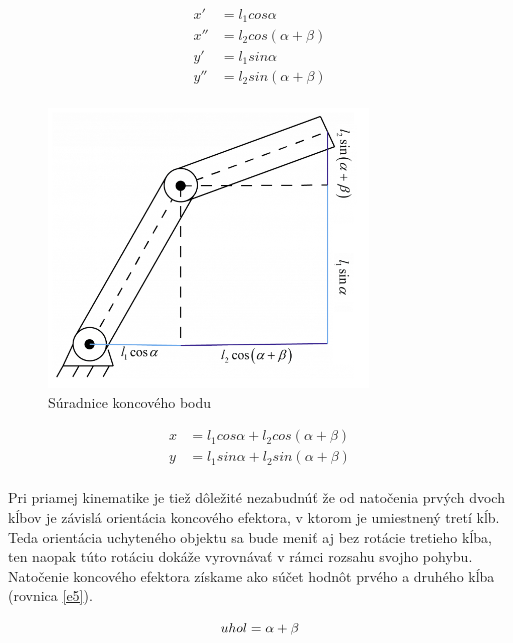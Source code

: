 \begin{equation}
	\begin{aligned}
		x'&= l_1 cos \alpha \\
		x''&= l_2 cos (\alpha + \beta) \\
		y'&= l_1 sin \alpha \\
		y''&= l_2 sin (\alpha + \beta) \\
	\end{aligned}
 \label{e1} 
\end{equation}

\begin{figure}[h]
	\centering
	\includegraphics[width=85mm]{img/FK2.png}
	\caption{Súradnice koncového bodu \cite{FK} } \label{OBRAZOK 4.9} 
\end{figure} 

\begin{equation}
	\begin{aligned}
		x&= l_1 cos \alpha + l_2 cos (\alpha + \beta) \\
		y&= l_1 sin \alpha +  l_2 sin (\alpha + \beta) \\
	\end{aligned}
 \label{e2} 
\end{equation}

Pri priamej kinematike je tiež dôležité nezabudnúť že od natočenia prvých dvoch kĺbov je závislá orientácia koncového efektora, v ktorom je umiestnený tretí kĺb. Teda orientácia uchyteného objektu sa bude meniť aj bez rotácie tretieho kĺba, ten naopak túto rotáciu dokáže vyrovnávať v rámci rozsahu svojho pohybu. Natočenie koncového efektora získame ako súčet hodnôt prvého a druhého kĺba (rovnica  \ref{e5}).

\begin{equation}
	uhol=\alpha + \beta \\
	\label{e5} 
\end{equation}

